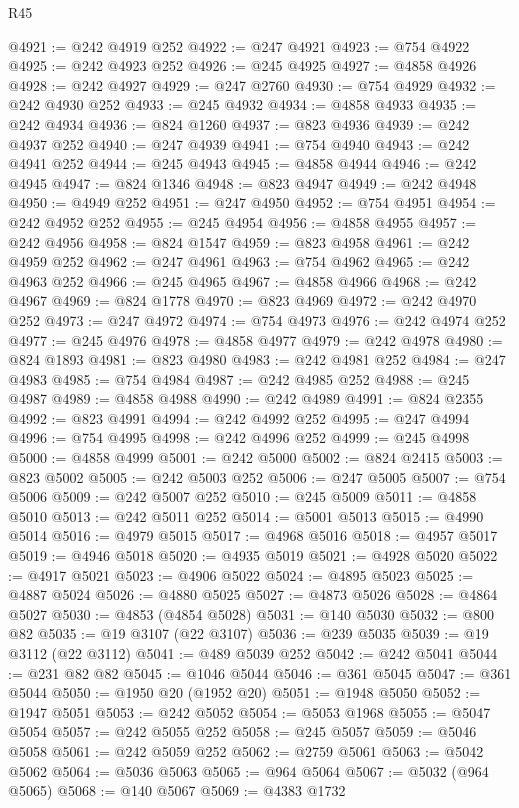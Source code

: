 \begin{lexlean}{R45}
\begin{coremodule}
{@4921 := @242 @4919 @252
@4922 := @247 @4921
@4923 := @754 @4922
@4925 := @242 @4923 @252
@4926 := @245 @4925
@4927 := @4858 @4926
@4928 := @242 @4927
@4929 := @247 @2760
@4930 := @754 @4929
@4932 := @242 @4930 @252
@4933 := @245 @4932
@4934 := @4858 @4933
@4935 := @242 @4934
@4936 := @824 @1260
@4937 := @823 @4936
@4939 := @242 @4937 @252
@4940 := @247 @4939
@4941 := @754 @4940
@4943 := @242 @4941 @252
@4944 := @245 @4943
@4945 := @4858 @4944
@4946 := @242 @4945
@4947 := @824 @1346
@4948 := @823 @4947
@4949 := @242 @4948
@4950 := @4949 @252
@4951 := @247 @4950
@4952 := @754 @4951
@4954 := @242 @4952 @252
@4955 := @245 @4954
@4956 := @4858 @4955
@4957 := @242 @4956
@4958 := @824 @1547
@4959 := @823 @4958
@4961 := @242 @4959 @252
@4962 := @247 @4961
@4963 := @754 @4962
@4965 := @242 @4963 @252
@4966 := @245 @4965
@4967 := @4858 @4966
@4968 := @242 @4967
@4969 := @824 @1778
@4970 := @823 @4969
@4972 := @242 @4970 @252
@4973 := @247 @4972
@4974 := @754 @4973
@4976 := @242 @4974 @252
@4977 := @245 @4976
@4978 := @4858 @4977
@4979 := @242 @4978
@4980 := @824 @1893
@4981 := @823 @4980
@4983 := @242 @4981 @252
@4984 := @247 @4983
@4985 := @754 @4984
@4987 := @242 @4985 @252
@4988 := @245 @4987
@4989 := @4858 @4988
@4990 := @242 @4989
@4991 := @824 @2355
@4992 := @823 @4991
@4994 := @242 @4992 @252
@4995 := @247 @4994
@4996 := @754 @4995
@4998 := @242 @4996 @252
@4999 := @245 @4998
@5000 := @4858 @4999
@5001 := @242 @5000
@5002 := @824 @2415
@5003 := @823 @5002
@5005 := @242 @5003 @252
@5006 := @247 @5005
@5007 := @754 @5006
@5009 := @242 @5007 @252
@5010 := @245 @5009
@5011 := @4858 @5010
@5013 := @242 @5011 @252
@5014 := @5001 @5013
@5015 := @4990 @5014
@5016 := @4979 @5015
@5017 := @4968 @5016
@5018 := @4957 @5017
@5019 := @4946 @5018
@5020 := @4935 @5019
@5021 := @4928 @5020
@5022 := @4917 @5021
@5023 := @4906 @5022
@5024 := @4895 @5023
@5025 := @4887 @5024
@5026 := @4880 @5025
@5027 := @4873 @5026
@5028 := @4864 @5027
@5030 := @4853 (@4854 @5028)
@5031 := @140 @5030
@5032 := @800 @82
@5035 := @19 @3107 (@22 @3107)
@5036 := @239 @5035
@5039 := @19 @3112 (@22 @3112)
@5041 := @489 @5039 @252
@5042 := @242 @5041
@5044 := @231 @82 @82
@5045 := @1046 @5044
@5046 := @361 @5045
@5047 := @361 @5044
@5050 := @1950 @20 (@1952 @20)
@5051 := @1948 @5050
@5052 := @1947 @5051
@5053 := @242 @5052
@5054 := @5053 @1968
@5055 := @5047 @5054
@5057 := @242 @5055 @252
@5058 := @245 @5057
@5059 := @5046 @5058
@5061 := @242 @5059 @252
@5062 := @2759 @5061
@5063 := @5042 @5062
@5064 := @5036 @5063
@5065 := @964 @5064
@5067 := @5032 (@964 @5065)
@5068 := @140 @5067
@5069 := @4383 @1732
}
\end{coremodule}
\end{lexlean}
